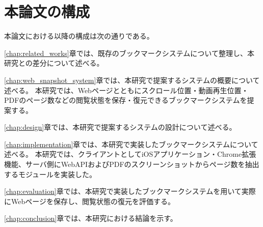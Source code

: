 \section{本論文の構成}

本論文における以降の構成は次の通りである。

\ref{chap:related_works}章では、既存のブックマークシステムについて整理し、本研究との差分について述べる。

\ref{chap:web_snapshot_system}章では、本研究で提案するシステムの概要について述べる。
本研究では、Webページとともにスクロール位置・動画再生位置・PDFのページ数などの閲覧状態を保存・復元できるブックマークシステムを提案する。

\ref{chap:design}章では、本研究で提案するシステムの設計について述べる。

\ref{chap:implementation}章では、本研究で実装したブックマークシステムについて述べる。
本研究では、クライアントとしてiOSアプリケーション・Chrome拡張機能、サーバ側にWebAPIおよびPDFのスクリーンショットからページ数を抽出するモジュールを実装した。

\ref{chap:evaluation}章では、本研究で実装したブックマークシステムを用いて実際にWebページを保存し、閲覧状態の復元を評価する。

\ref{chap:conclusion}章では、本研究における結論を示す。